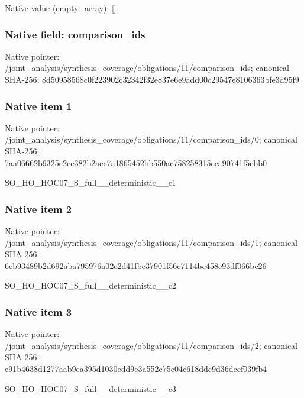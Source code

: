 \documentclass[10pt,a4paper]{article}
\begin{document}
Native value (empty\_\allowbreak{}array): []

\subsubsection{Native field: comparison\_\allowbreak{}ids}
Native pointer: /joint\_\allowbreak{}analysis/synthesis\_\allowbreak{}coverage/obligations/11/comparison\_\allowbreak{}ids; canonical SHA-256: 8d50958568c0f223902c32342f32e837e6e9add00c29547e8106363bfe3d95f9

\subsubsection{Native item 1}
Native pointer: /joint\_\allowbreak{}analysis/synthesis\_\allowbreak{}coverage/obligations/11/comparison\_\allowbreak{}ids/0; canonical SHA-256: 7aa06662b9325e2cc382b2aec7a1865452bb550ac758258315cca90741f5cbb0

\begingroup\raggedright\sloppy SO\_\allowbreak{}HO\_\allowbreak{}HOC07\_\allowbreak{}S\_\allowbreak{}full\_\allowbreak{}\_\allowbreak{}deterministic\_\allowbreak{}\_\allowbreak{}c1\par\endgroup

\subsubsection{Native item 2}
Native pointer: /joint\_\allowbreak{}analysis/synthesis\_\allowbreak{}coverage/obligations/11/comparison\_\allowbreak{}ids/1; canonical SHA-256: 6cb93489b2d692aba795976a02c2d41fbe37901f56c7114bc458e93df066bc26

\begingroup\raggedright\sloppy SO\_\allowbreak{}HO\_\allowbreak{}HOC07\_\allowbreak{}S\_\allowbreak{}full\_\allowbreak{}\_\allowbreak{}deterministic\_\allowbreak{}\_\allowbreak{}c2\par\endgroup

\subsubsection{Native item 3}
Native pointer: /joint\_\allowbreak{}analysis/synthesis\_\allowbreak{}coverage/obligations/11/comparison\_\allowbreak{}ids/2; canonical SHA-256: e91b4638d1277aab9ea395d1030edd9e3a552e75c04c618ddc9d36dcef039fb4

\begingroup\raggedright\sloppy SO\_\allowbreak{}HO\_\allowbreak{}HOC07\_\allowbreak{}S\_\allowbreak{}full\_\allowbreak{}\_\allowbreak{}deterministic\_\allowbreak{}\_\allowbreak{}c3\par\endgroup
\end{document}
